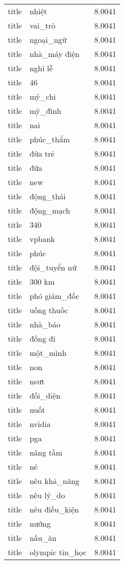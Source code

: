 \documentclass{article}
\begin{document}
\begin{tabular}{lll}
title & nhiệt & 8.0041\\
title & vai\_trò & 8.0041\\
title & ngoại\_ngữ & 8.0041\\
title & nhà\_máy điện & 8.0041\\
title & nghỉ lễ & 8.0041\\
title & 46 & 8.0041\\
title & mỹ\_chi & 8.0041\\
title & mỹ\_đình & 8.0041\\
title & nai & 8.0041\\
title & phúc\_thẩm & 8.0041\\
title & đứa trẻ & 8.0041\\
title & đứa & 8.0041\\
title & new & 8.0041\\
title & động\_thái & 8.0041\\
title & động\_mạch & 8.0041\\
title & 340 & 8.0041\\
title & vpbank & 8.0041\\
title & phúc & 8.0041\\
title & đội\_tuyển nữ & 8.0041\\
title & 300 km & 8.0041\\
title & phó giám\_đốc & 8.0041\\
title & uống thuốc & 8.0041\\
title & nhà\_báo & 8.0041\\
title & đồng đi & 8.0041\\
title & một\_mình & 8.0041\\
title & non & 8.0041\\
title & nsưt & 8.0041\\
title & đối\_diện & 8.0041\\
title & nuốt & 8.0041\\
title & nvidia & 8.0041\\
title & pga & 8.0041\\
title & nâng tầm & 8.0041\\
title & né & 8.0041\\
title & nêu khả\_năng & 8.0041\\
title & nêu lý\_do & 8.0041\\
title & nêu điều\_kiện & 8.0041\\
title & nướng & 8.0041\\
title & nấu\_ăn & 8.0041\\
title & olympic tin\_học & 8.0041\\

\end{tabular}
\end{document}
